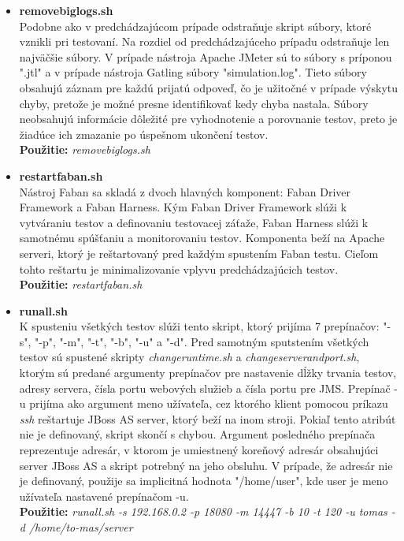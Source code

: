 \documentclass[12pt,oneside,final]{fithesis-utf8}
\newcommand\underscore[1]{\underline{\hspace{8pt}}}
\begin{document}
\begin{itemize}
\item \textbf{remove\underscore{}big\underscore{}logs.sh}\\
Podobne ako v predchádzajúcom prípade odstraňuje skript súbory, ktoré vznikli pri testovaní. Na rozdiel od predchádzajúceho prípadu odstraňuje len najväčšie súbory. V prípade nástroja Apache JMeter sú to súbory s príponou "{}.jtl"{} a v prípade nástroja Gatling súbory "{}simulation.log"{}. Tieto súbory obsahujú záznam pre každú prijatú odpoveď, čo je užitočné v prípade výskytu chyby, pretože je možné presne identifikovať kedy chyba nastala. Súbory neobsahujú informácie dôležité pre vyhodnotenie a porovnanie testov, preto je žiadúce ich zmazanie po úspešnom ukončení testov.\\
\textbf{Použitie:} \textit{remove\underscore{}big\underscore{}logs.sh}

\item \textbf{restart\underscore{}faban.sh}\\
Nástroj Faban sa skladá z dvoch hlavných komponent: Faban Driver Framework a Faban Harness. Kým Faban Driver Framework slúži k vytváraniu testov a definovaniu testovacej záťaže, Faban Harness slúži k samotnému spúšťaniu a monitorovaniu testov. Komponenta beží na Apache serveri, ktorý je reštartovaný pred každým spustením Faban testu. Cieľom tohto reštartu je minimalizovanie vplyvu predchádzajúcich testov.\\
\textbf{Použitie:} \textit{restart\underscore{}faban.sh}

\item \textbf{run\underscore{}all.sh}\\
K spusteniu všetkých testov slúži tento skript, ktorý prijíma 7 prepínačov: "{}-s"{}, "{}-p"{}, "{}-m"{}, "{}-t"{}, "{}-b"{}, "{}-u"{} a "{}-d"{}. Pred samotným sputstením všetkých testov sú spustené skripty \textit{change\underscore{}runtime.sh} a \textit{change\underscore{}server\underscore{}and\underscore{}port.sh}, ktorým sú predané argumenty prepínačov pre nastavenie dĺžky trvania testov, adresy servera, čísla portu webových služieb a čísla portu pre JMS. Prepínač -u prijíma ako argument meno užívateľa, cez ktorého klient pomocou príkazu \textit{ssh} reštartuje JBoss AS server, ktorý beží na inom stroji. Pokiaľ tento atribút nie je definovaný, skript skončí s chybou. Argument posledného prepínača reprezentuje adresár, v ktorom je umiestnený koreňový adresár obsahujúci server JBoss AS a skript potrebný na jeho obsluhu. V prípade, že adresár nie je definovaný, použije sa implicitná hodnota "{/home/user}"{}, kde user je meno užívateľa nastavené prepínačom -u.\\
\textbf{Použitie:} \textit{run\underscore{}all.sh -s 192.168.0.2 -p 18080 -m 14447 -b 10 -t 120 -u tomas -d /home/to-mas/server}

\end{itemize}
\end{document}

